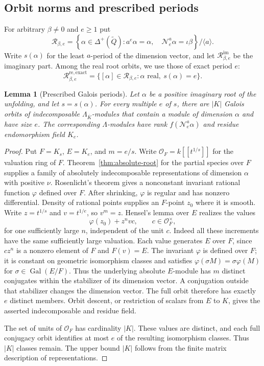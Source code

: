 \documentclass[11pt, reqno]{amsart}
\numberwithin{equation}{section}
\newtheorem{lemma}[theorem]{Lemma}
\theoremstyle{definition}
\theoremstyle{remark}
\newcommand{\op}[1]{\operatorname{#1}}
\newcommand{\mr}[1]{\mathrm{#1}}
\newcommand{\mc}[1]{\mathcal{#1}}
\newcommand{\ms}[1]{\mathscr{#1}}
\newcommand{\OO}{\mc O}
\newcommand{\Gal}{\op{Gal}}
\newcommand{\Qbar}{\widetilde Q}
\newcommand{\Kbar}{\overline K}
\begin{document}
\subsection{Orbit norms and prescribed periods}

For arbitrary $\beta\ne0$ and $e\geq1$ put
\begin{equation}\label{eq:allrank-root-orbits} \ms R_{\beta,e} =\left\{\alpha\in\Delta^+(\Qbar): a^e\alpha=\alpha,\quad \mc N_e^a\alpha=\iota\beta \right\}/\langle a\rangle.\end{equation}
Write $s(\alpha)$ for the least $a$-period of the dimension
vector, and let $\ms R^{\mr{im}}_{\beta,e}$ be the
imaginary part. Among the real root orbits, we use those of exact period $e$:
\[ \ms R^{\mr{re,exact}}_{\beta,e} =\{[\alpha]\in\ms R_{\beta,e}:\alpha\text{ real},\ s(\alpha)=e\}. \]


\begin{lemma}[Prescribed Galois periods]
\label{lem:allrank-exact-period}
Let $\alpha$ be a positive imaginary root of the unfolding, and let
$s=s(\alpha)$. For every multiple $e$ of $s$, there are $|K|$ Galois
orbits of indecomposable $\Lambda_{\Kbar}$-modules that contain a module
of dimension $\alpha$ and have size $e$. The corresponding
$\Lambda$-modules have rank $f(\mc N_e^a\alpha)$ and residue
endomorphism field $K_e$.
\end{lemma}
\begin{proof}
Put $F=K_s$, $E=K_e$, and $m=e/s$. Write
$\OO_F=k[[t^{1/s}]]$ for the valuation ring of $F$.
Theorem~\ref{thm:absolute-root}
for the partial species over $F$ supplies a family of absolutely indecomposable representations of
dimension $\alpha$ with positive $\nu$. Rosenlicht's theorem gives
a nonconstant invariant rational function $\varphi$ defined over $F$.
After shrinking, $\varphi$ is regular and has nonzero differential.
Density of rational points supplies an $F$-point $z_0$ where it is
smooth. Write $z=t^{1/s}$ and $v=t^{1/e}$, so $v^m=z$.
Hensel's lemma over $E$ realizes the values
\[ \varphi(z_0)+z^nvc, \qquad c\in\OO_F^\times, \]
for one sufficiently large $n$, independent of the unit $c$.
Indeed all these increments have the same sufficiently large valuation.
Each value generates $E$ over $F$, since $c z^n$ is a nonzero element
of $F$ and $F(v)=E$. The invariant $\varphi$ is defined over $F$; it is
constant on geometric isomorphism classes and satisfies
$\varphi(\sigma M)=\sigma \varphi(M)$ for $\sigma\in\Gal(E/F)$.
Thus the underlying absolute $E$-module has $m$ distinct
conjugates within the stabilizer of its dimension vector. A
conjugation outside that stabilizer changes the dimension vector.
The full orbit therefore has exactly $e$ distinct members.
Orbit descent, or restriction of scalars from $E$ to $K$, gives
the asserted indecomposable and residue field.

The set of units of $\OO_F$ has cardinality $|K|$.
These values are distinct, and each full conjugacy orbit
identifies at most $e$ of the resulting isomorphism classes.
Thus $|K|$ classes remain. The upper bound $|K|$ follows from
the finite matrix description of representations.
\end{proof}
\end{document}
